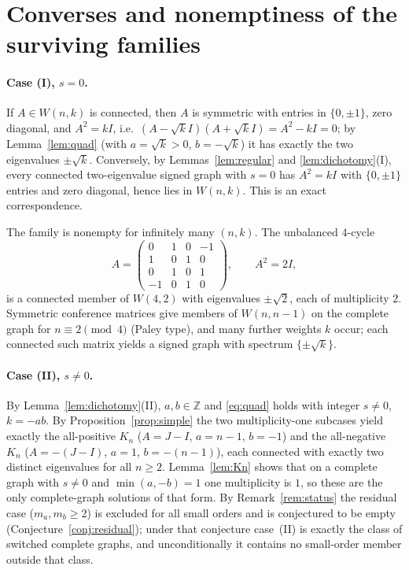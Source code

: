 \documentclass{amsart}
\theoremstyle{definition}
\begin{document}
\section{Converses and nonemptiness of the surviving families}\label{sec:examples}

\paragraph{Case (I), $s=0$.}
If $A\in W(n,k)$ is connected, then $A$ is symmetric with entries in
$\{0,\pm1\}$, zero diagonal, and $A^2=kI$, i.e.\ $(A-\sqrt kI)(A+\sqrt kI)=
A^2-kI=0$; by Lemma~\ref{lem:quad} (with $a=\sqrt k>0$, $b=-\sqrt k$) it has
exactly the two eigenvalues $\pm\sqrt k$. Conversely, by
Lemmas~\ref{lem:regular} and \ref{lem:dichotomy}(I), every connected
two-eigenvalue signed graph with $s=0$ has $A^2=kI$ with $\{0,\pm1\}$ entries
and zero diagonal, hence lies in $W(n,k)$. This is an exact correspondence.

The family is nonempty for infinitely many $(n,k)$. The unbalanced $4$-cycle
\[
A=\begin{pmatrix}0&1&0&-1\\ 1&0&1&0\\ 0&1&0&1\\ -1&0&1&0\end{pmatrix},
\qquad A^2=2I,
\]
is a connected member of $W(4,2)$ with eigenvalues $\pm\sqrt2$, each of
multiplicity $2$. Symmetric conference matrices give members of $W(n,n-1)$ on
the complete graph for $n\equiv2\pmod4$ (Paley type), and many further weights
$k$ occur; each connected such matrix yields a signed graph with spectrum
$\{\pm\sqrt k\}$.

\paragraph{Case (II), $s\ne0$.}
By Lemma~\ref{lem:dichotomy}(II), $a,b\in\mathbb Z$ and \eqref{eq:quad} holds
with integer $s\ne0$, $k=-ab$. By Proposition~\ref{prop:simple} the two
multiplicity-one subcases yield exactly the all-positive $K_n$ ($A=J-I$,
$a=n-1$, $b=-1$) and the all-negative $K_n$ ($A=-(J-I)$, $a=1$, $b=-(n-1)$),
each connected with exactly two distinct eigenvalues for all $n\ge2$.
Lemma~\ref{lem:Kn} shows that on a complete graph with $s\ne0$ and
$\min(a,-b)=1$ one multiplicity is $1$, so these are the only complete-graph
solutions of that form. By Remark~\ref{rem:status} the residual case
($m_a,m_b\ge2$) is excluded for all small orders and is conjectured to be empty
(Conjecture~\ref{conj:residual}); under that conjecture case~(II) is exactly
the class of switched complete graphs, and unconditionally it contains no
small-order member outside that class.
\end{document}
